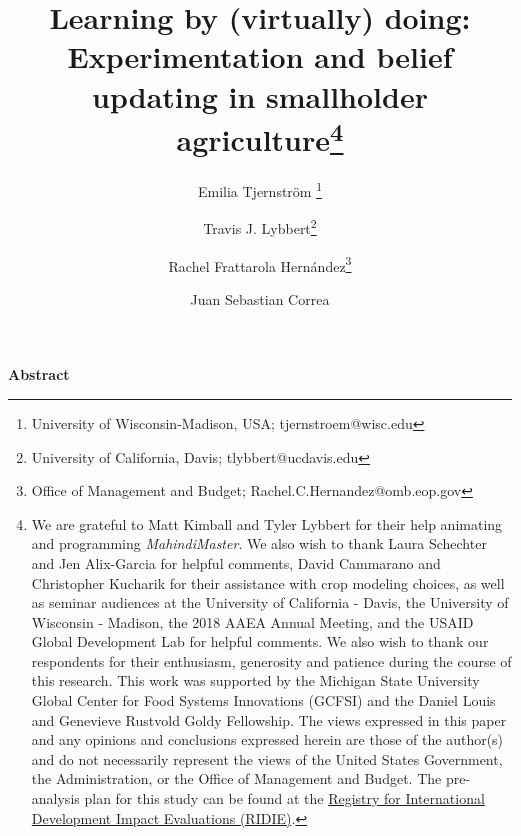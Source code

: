 \documentclass[12pt,letterpaper]{article}
\begin{document}
\author{Emilia Tjernstr\"om \thanks{University of Wisconsin-Madison, USA; tjernstroem@wisc.edu}
\and
Travis J. Lybbert\thanks{University of California, Davis; tlybbert@ucdavis.edu}
\and 
Rachel Frattarola Hern\'andez\thanks{Office of Management and Budget; Rachel.C.Hernandez@omb.eop.gov}
\and 
Juan Sebastian Correa\footnotemark[3]}


\title{Learning by (virtually) doing: Experimentation and belief updating in smallholder agriculture\thanks{We are grateful to Matt Kimball and Tyler Lybbert for their help animating and programming \textit{MahindiMaster}. We also wish to thank Laura Schechter and Jen Alix-Garcia for helpful comments, David Cammarano and Christopher Kucharik for their assistance with crop modeling choices, as well as seminar audiences at the University of California - Davis, the University of Wisconsin - Madison, the 2018 AAEA Annual Meeting, and the USAID Global Development Lab for helpful comments. We also wish to thank our respondents for their enthusiasm, generosity and patience during the course of this research. This work was supported by the Michigan State University Global Center for Food Systems Innovations (GCFSI) and the Daniel Louis and Genevieve Rustvold Goldy Fellowship. The views expressed in this paper and any opinions and conclusions expressed herein are those of the author(s) and do not necessarily represent the views of the United States Government, the Administration, or the Office of Management and Budget. The pre-analysis plan for this study can be found at the \href{http://ridie.org/index.php?r=search/detailView&id=528}{Registry for International Development Impact Evaluations (RIDIE)}.}}

\maketitle
\thispagestyle{empty}

{
\centering
\textbf{Abstract}
}
\end{document}
